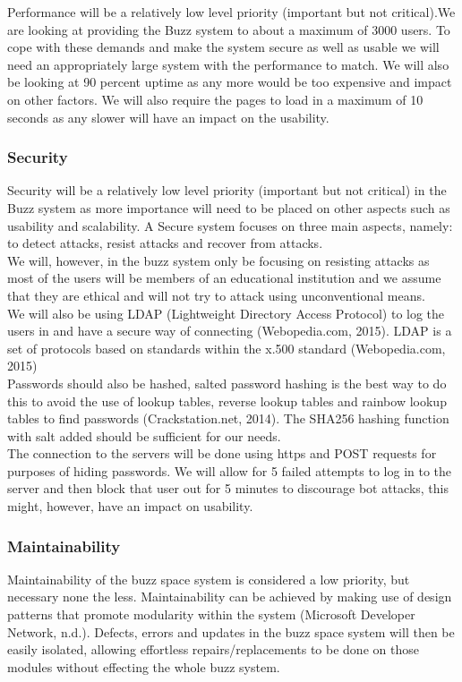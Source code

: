 Performance will be a relatively low level priority (important but not critical).We are looking at providing the Buzz system to about a maximum of 3000 users. To cope with these demands and make the system secure as well as usable we will need an appropriately large system with the performance to match. We will also be looking at 90 percent uptime as any more would be too expensive and impact on other factors. We will also require the pages to load in a maximum of 10 seconds as any slower will have an impact on the usability.


\subsubsection{Security}
Security will be a relatively low level priority (important but not critical) in the Buzz system as more importance will need to be placed on other aspects such as usability and scalability. A Secure system focuses on three main aspects, namely: to detect attacks, resist attacks and recover from attacks.\\

We will, however, in the buzz system only be focusing on resisting attacks as most of the users will be members of an educational institution and we assume that they are ethical and will not try to attack using unconventional means.\\

We will also be using LDAP (Lightweight Directory Access Protocol) to log the users in and have a secure way of connecting (Webopedia.com, 2015). LDAP is a set of protocols based on standards within the x.500 standard (Webopedia.com, 2015)\\

Passwords should also be hashed, salted password hashing is the best way to do this to avoid the use of lookup tables, reverse lookup tables and rainbow lookup tables to find passwords (Crackstation.net, 2014). The SHA256 hashing function with salt added should be sufficient for our needs.\\

The connection to the servers will be done using https and POST requests for purposes of hiding passwords. We will allow for 5 failed attempts to log in to the server and then block that user out for 5 minutes to discourage bot attacks, this might, however, have an impact on usability.\\


\subsubsection{Maintainability}
Maintainability of the buzz space system is considered a low priority, but necessary none the less. Maintainability can be achieved by making use of design patterns that promote modularity within the system (Microsoft Developer Network, n.d.). Defects, errors and updates in the buzz space system will then be easily isolated, allowing effortless repairs/replacements to be done on those modules without effecting the whole buzz system.\\


